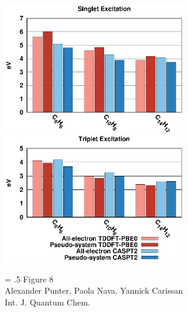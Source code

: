 \documentclass[12pt]{article}
\begin{document}
\clearpage

\begin{figure}
\begin{center}
\includegraphics[width=8cm]{methodcomp_s_excitations.eps}\\
\includegraphics[width=8cm]{methodcomp_t_excitations.eps}\\
\end{center}
{\Large
\begin{minipage}[t]{3in}
\baselineskip = .5\baselineskip
Figure 8 \\
Alexander Punter, Paola Nava, Yannick Carissan\\
Int. J. Quantum Chem.
\end{minipage}
}
\end{figure}

\clearpage
\end{document}
